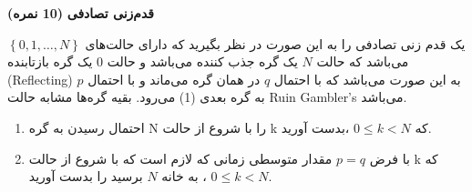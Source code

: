 \Large \textbf{قدم‌زنی تصادفی}
\large \textbf{(10 نمره)}

\normalsize \vspace{0.5cm}

یک قدم زنی تصادفی را به این صورت در نظر بگیرید که دارای حالت‌های
$\left\{ {0,1, \ldots ,N} \right\}$
 می‌باشد که حالت $N$ یک گره جذب کننده می‌باشد و حالت $0$ یک گره بازتابنده (Reflecting) به این صورت می‌باشد که با احتمال $q$ در همان گره می‌ماند و با احتمال $p$ به گره بعدی (1) می‌رود.‌ بقیه گره‌ها مشابه حالت Ruin Gambler's می‌باشد.
 
\begin{enumerate}[label=(\alph*)]
	
	\item
	احتمال رسیدن به گره N را با شروع از حالت k که
	$0 \le k < N$
	،بدست آورید.
	\item
	با فرض
	$p=q$
	مقدار متوسطی زمانی که لازم است که با شروع از حالت k که
	$0 \le k < N$
	، به خانه $N$ برسید را بدست آورید.
	
\end{enumerate}